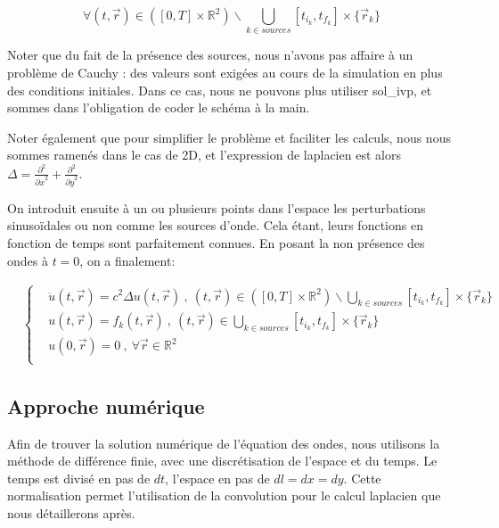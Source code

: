 \documentclass[11pt, a4paper]{article}
\begin{document}
$$
    \forall (t,\vec{r})\in ([0,T]\times\mathbb{R}^2)\backslash\bigcup\limits_{k\in sources}[t_{i_k},t_{f_k}]\times\{\vec{r}_k\}
$$

Noter que du fait de la présence des sources, nous n'avons pas affaire à un problème de Cauchy : des valeurs sont exigées au cours de la simulation en plus des conditions initiales. Dans ce cas, nous ne pouvons plus utiliser sol\_ivp, et sommes dans l'obligation de coder le schéma à la main.

Noter également que pour simplifier le problème et faciliter les calculs, nous nous sommes ramenés dans le cas de 2D, et l'expression de laplacien est alors $\Delta=\frac{\partial^2}{{\partial x}^2}+\frac{\partial^2}{{\partial y}^2}$.

On introduit ensuite à un ou plusieurs points dans l'espace les perturbations sinusoïdales ou non comme les sources d'onde. Cela étant, leurs fonctions en fonction de temps sont parfaitement connues. En posant la non présence des ondes à $t=0$, on a finalement:

\begin{align*}
     & \left\{
    \begin{aligned}
         & \ddot{u}(t,\vec{r})=c^2\Delta u(t,\vec{r})\ ,\ (t,\vec{r})\in ([0,T]\times\mathbb{R}^2)\backslash\bigcup\limits_{k\in sources}[t_{i_k},t_{f_k}]\times\{\vec{r}_k\} \\
         & u(t,\vec{r})=f_k(t,\vec{r})\ ,\ (t,\vec{r})\in\bigcup\limits_{k\in sources}[t_{i_k},t_{f_k}]\times\{\vec{r}_k\}                                                    \\
         & u(0,\vec{r})=0\ ,\ \forall\vec{r}\in\mathbb{R}^2                                                                                                                   \\
    \end{aligned}
    \right.
\end{align*}

\subsection{Approche numérique}
Afin de trouver la solution numérique de l'équation des ondes, nous utilisons la méthode de différence finie, avec une discrétisation de l'espace et du temps. Le temps est divisé en pas de $dt$, l'espace en pas de $dl=dx=dy$. Cette normalisation permet l'utilisation de la convolution pour le calcul laplacien que nous détaillerons après.
\end{document}
